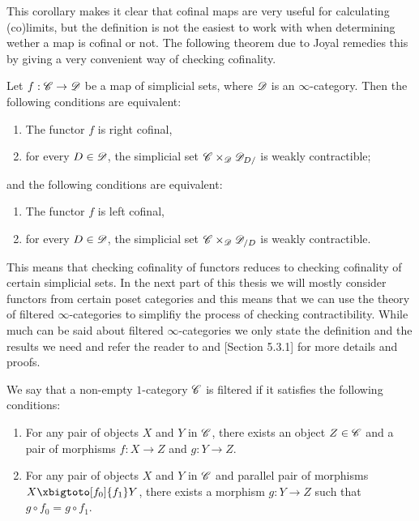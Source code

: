 \documentclass[../../thesis.tex]{subfiles}
\begin{document}
This corollary makes it clear that cofinal maps are very useful for calculating (co)limits, but the definition is not the easiest to work with when determining wether a map is cofinal or not.
The following theorem due to Joyal remedies this by giving a very convenient way of checking cofinality.
\begin{theorem}{\cite[\href{https://kerodon.net/tag/02NY}{Theorem 02NY}]{kerodon}\label{superlemma}}
    Let \(f: \mathscr{C} \to \mathscr{D}\) be a map of simplicial sets, where $\mathscr{D}$ is an $\infty$-category.
    Then the following conditions are equivalent:
    \begin{enumerate}
        \item The functor $f$ is right cofinal,
        \item for every $D\in \mathscr{D}$, the simplicial set $\mathscr{C}\times_{\mathscr{D}} \mathscr{D}_{D/}$ is weakly contractible;
    \end{enumerate}
    and the following conditions are equivalent:
    \begin{enumerate}
        \item The functor $f$ is left cofinal,
        \item for every $D\in \mathscr{D}$, the simplicial set $\mathscr{C}\times_{\mathscr{D}} \mathscr{D}_{/D}$ is weakly contractible.
    \end{enumerate}
\end{theorem}
This means that checking cofinality of functors reduces to checking cofinality of certain simplicial sets.
In the next part of this thesis we will mostly consider functors from certain poset categories and this means that we can use the theory of filtered $\infty$-categories to simplifiy the process of checking contractibility.
While much can be said about filtered $\infty$-categories we only state the definition and the results we need and refer the reader to \cite[\href{https://kerodon.net/tag/02P8}{Subsection 02P8}]{kerodon} and \cite{HTT}[Section 5.3.1] for more details and proofs.
\begin{definition}
    We say that a non-empty $1$-category $\mathscr{C}$ is filtered if it satisfies the following conditions:
    \begin{enumerate}
        \item For any pair of objects $X$ and $Y$ in $\mathscr{C}$, there exists an object $Z \in \mathscr{C}$ and a pair of morphisms $f : X\to Z$ and $g : Y\to Z$.
        \item For any pair of objects $X$ and $Y$ in $\mathscr{C}$ and parallel pair of morphisms $X \xbigtoto[f_0]{f_1} Y$, there exists a morphism $g : Y \to Z$ such that $g \circ f_0 = g \circ f_1$.
    \end{enumerate}
\end{definition}
\end{document}
